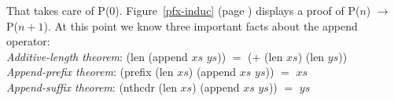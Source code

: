 That takes care of P(0). Figure~\ref{pfx-induc}
(page \pageref{pfx-induc}) displays a proof of P($n$) $\rightarrow$ P($n+1$).
At this point we know three important facts about the \textsf{append} operator:\\
\hspace*{1cm}\emph{Additive-length theorem}: \textsf{(len (append $xs$ $ys$))} $=$ \textsf{(+ (len $xs$) (len $ys$))}\label{app-pfx-thm}\\
\hspace*{1cm}\emph{Append-prefix theorem}: \textsf{(prefix (len $xs$) (append $xs$ $ys$))} $=$ $xs$\\
\hspace*{1cm}\emph{Append-suffix theorem}: \textsf{(nthcdr (len $xs$) (append $xs$ $ys$))} $=$ $ys$

